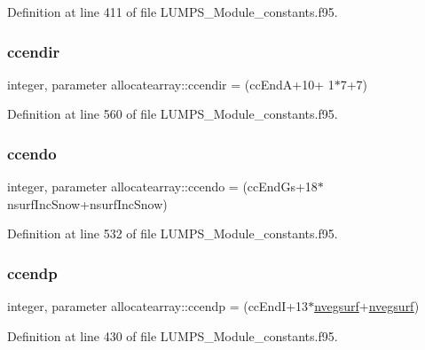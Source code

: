 Definition at line 411 of file L\+U\+M\+P\+S\+\_\+\+Module\+\_\+constants.\+f95.

\mbox{\label{namespaceallocatearray_a1e276529754e8a86220ffbb33ed42104}} 
\subsubsection{\texorpdfstring{ccendir}{ccendir}}
{\footnotesize\ttfamily integer, parameter allocatearray\+::ccendir = (cc\+EndA+10+ 1$\ast$7+7)}



Definition at line 560 of file L\+U\+M\+P\+S\+\_\+\+Module\+\_\+constants.\+f95.

\mbox{\label{namespaceallocatearray_a5faced76ae500e1295bf6364fd110bd1}} 
\subsubsection{\texorpdfstring{ccendo}{ccendo}}
{\footnotesize\ttfamily integer, parameter allocatearray\+::ccendo = (cc\+End\+Gs+18$\ast$nsurf\+Inc\+Snow+nsurf\+Inc\+Snow)}



Definition at line 532 of file L\+U\+M\+P\+S\+\_\+\+Module\+\_\+constants.\+f95.

\mbox{\label{namespaceallocatearray_ae2a7ed1b10fa2033873854a4ea5c91e5}} 
\subsubsection{\texorpdfstring{ccendp}{ccendp}}
{\footnotesize\ttfamily integer, parameter allocatearray\+::ccendp = (cc\+EndI+13$\ast$\hyperlink{namespaceallocatearray_abb987c3b35dd321963fd53d38f10236f}{nvegsurf}+\hyperlink{namespaceallocatearray_abb987c3b35dd321963fd53d38f10236f}{nvegsurf})}



Definition at line 430 of file L\+U\+M\+P\+S\+\_\+\+Module\+\_\+constants.\+f95.

\mbox{\label{namespaceallocatearray_a2186173f8e0c5718ab0b784ad2afea3c}} 
